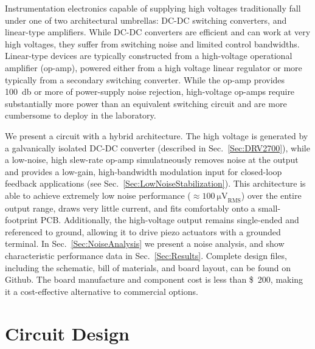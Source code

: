 \documentclass[aip,rsi,reprint]{revtex4-1} %
\begin{document}
Instrumentation electronics capable of supplying high voltages traditionally fall under one of two architectural umbrellas: DC-DC switching converters, and linear-type amplifiers.
While DC-DC converters are efficient and can work at very high voltages, they suffer from switching noise and limited control bandwidths.
Linear-type devices are typically constructed from a high-voltage operational amplifier (op-amp), powered either from a high voltage linear regulator or more typically from a secondary switching converter.
While the op-amp provides \SI{100}{\decibel} or more of power-supply noise rejection, high-voltage op-amps require substantially more power than an equivalent switching circuit and are more cumbersome to deploy in the laboratory.

We present a circuit with a hybrid architecture.
The high voltage is generated by a galvanically isolated DC-DC converter (described in Sec.~\ref{Sec:DRV2700}), while a low-noise, high slew-rate op-amp simulatneously removes noise at the output and provides a low-gain, high-bandwidth modulation input for closed-loop feedback applications  (see Sec.~\ref{Sec:LowNoiseStabilization}).
This architecture is able to achieve extremely low noise performance ($\approx\SI{100}{\micro\volt}_{\text{RMS}}$) over the entire output range, draws very little current, and fits comfortably onto a small-footprint PCB.
Additionally, the high-voltage output remains single-ended and referenced to ground, allowing it to drive piezo actuators with a grounded terminal.
In Sec.~\ref{Sec:NoiseAnalysis} we present a noise analysis, and show characteristic performance data in Sec.~\ref{Sec:Results}.
Complete design files, including the schematic, bill of materials, and board layout, can be found on Github\cite{DesignFiles}.
The board manufacture and component cost is less than \SI{200}[\$]{}, making it a cost-effective alternative to commercial options. 



\section{Circuit Design}
\label{Sec:Circuit}
\end{document}
